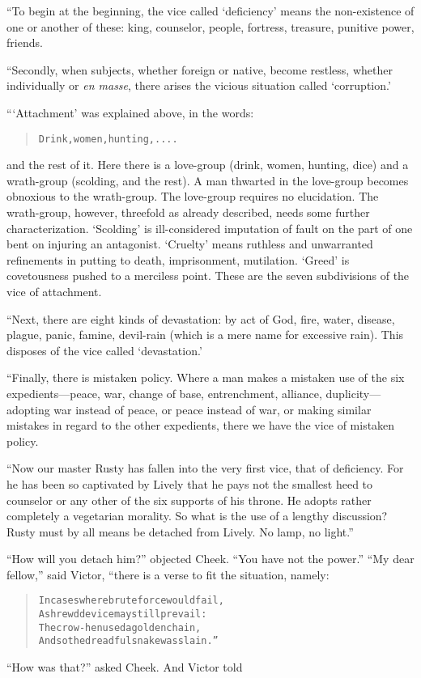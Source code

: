 \documentclass[article, twoside, 14pt]{memoir}
\renewenvironment{verbatim}{%
\begin{quote}%
\vskip -10pt%
\begin{alltt}\normalfont\large}{\end{alltt}%
\end{quote}%
\vskip -10pt
} %
\begin{document}
“To begin at the beginning, the vice called `deficiency' means the
non-existence of one or another of these: king, counselor, people,
fortress, treasure, punitive power, friends.

“Secondly, when subjects, whether foreign or native, become
restless, whether individually or \emph{en masse}, there arises the
vicious situation called `corruption.'

“`Attachment' was explained above, in the words:

\begin{verbatim}
Drink, women, hunting, ....
\end{verbatim}
and the rest of it. Here there is a love-group (drink, women,
hunting, dice) and a wrath-group (scolding, and the rest). A man
thwarted in the love-group becomes obnoxious to the wrath-group.
The love-group requires no elucidation. The wrath-group, however,
threefold as already described, needs some further
characterization. `Scolding' is ill-considered imputation of fault
on the part of one bent on injuring an antagonist. `Cruelty' means
ruthless and unwarranted refinements in putting to death,
imprisonment, mutilation. `Greed' is covetousness pushed to a
merciless point. These are the seven subdivisions of the vice of
attachment.

“Next, there are eight kinds of devastation: by act of God, fire,
water, disease, plague, panic, famine, devil-rain (which is a mere
name for excessive rain). This disposes of the vice called
`devastation.'

“Finally, there is mistaken policy. Where a man makes a mistaken
use of the six expedients---peace, war, change of base,
entrenchment, alliance, duplicity---adopting war instead of peace,
or peace instead of war, or making similar mistakes in regard to
the other expedients, there we have the vice of mistaken policy.

``Now our master Rusty has fallen into the very first vice, that of deficiency. For he has been so captivated by Lively that he pays not the smallest heed to counselor or any other of the six supports of his throne. He adopts rather completely a vegetarian morality. So what is the use of a lengthy discussion? Rusty must by all means be detached from Lively. No lamp, no light.''

``How will you detach him?'' objected Cheek.
``You have not the power.'' ``My dear fellow,'' said Victor, “there
is a verse to fit the situation, namely:

\begin{verbatim}
In cases where brute force would fail,
    A shrewd device may still prevail:
The crow-hen used a golden chain,
    And so the dreadful snake was slain.”
\end{verbatim}
``How was that?'' asked Cheek. And Victor told
\end{document}
